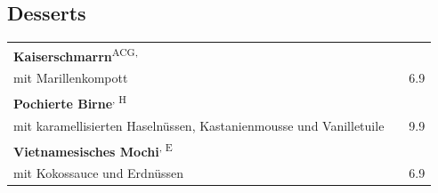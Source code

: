 \documentclass[a4paper,12pt]{article}
\newcommand{\vegan}{\textbf{\scriptsize \color{vegan}{Vegan}}}
\newcommand{\vegetarisch}{\textbf{\scriptsize \color{vegan}{Veg}}}
\begin{document}
\begin{multicols}{2}
\section*{Desserts}
\begin{tabular}{Lrr}
\textbf{Kaiserschmarrn}\textsuperscript{{\scriptsize ACG, \vegetarisch}}\\
\hspace{0.4cm}\scriptsize mit Marillenkompott & & 6.9\\
\textbf{Pochierte Birne}\textsuperscript{{\scriptsize \vegan, H}}\\
\hspace{0.4cm}\scriptsize mit karamellisierten Haselnüssen, Kastanienmousse und Vanilletuile & & 9.9\\
\textbf{Vietnamesisches Mochi}\textsuperscript{{\scriptsize \vegan, E}}\\
\hspace{0.4cm}\scriptsize mit Kokossauce und Erdnüssen & & 6.9 \\
\end{tabular}





\end{multicols}
\end{document}
